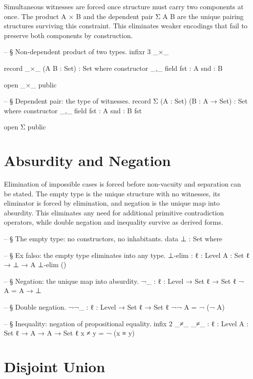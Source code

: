 \documentclass[11pt,a4paper]{book}
\def\texttt#1{#1}%
\begin{document}
Simultaneous witnesses are forced once structure must carry two components at once.
The product \texttt{A × B} and the dependent pair \texttt{Σ A B} are the unique pairing structures surviving this constraint.
This eliminates weaker encodings that fail to preserve both components by construction.

\begin{code}
-- § Non-dependent product of two types.
infixr 3 _×_

record _×_ (A B : Set) : Set where
  constructor _,_
  field
    fst : A
    snd : B

open _×_ public

-- § Dependent pair: the type of witnesses.
record Σ (A : Set) (B : A → Set) : Set where
  constructor _,_
  field
    fst : A
    snd : B fst

open Σ public
\end{code}

\section{Absurdity and Negation}

Elimination of impossible cases is forced before non-vacuity and separation can be stated.
The empty type is the unique structure with no witnesses, its eliminator is forced by elimination, and negation is the unique map into absurdity.
This eliminates any need for additional primitive contradiction operators, while double negation and inequality survive as derived forms.

\begin{code}
-- § The empty type: no constructors, no inhabitants.
data ⊥ : Set where

-- § Ex falso: the empty type eliminates into any type.
⊥-elim : {ℓ : Level} {A : Set ℓ} → ⊥ → A
⊥-elim ()

-- § Negation: the unique map into absurdity.
¬_ : {ℓ : Level} → Set ℓ → Set ℓ
¬ A = A → ⊥

-- § Double negation.
¬¬_ : {ℓ : Level} → Set ℓ → Set ℓ
¬¬ A = ¬ (¬ A)

-- § Inequality: negation of propositional equality.
infix 2 _≠_
_≠_ : {ℓ : Level} {A : Set ℓ} → A → A → Set ℓ
x ≠ y = ¬ (x ≡ y)
\end{code}

\section{Disjoint Union}
\end{document}
